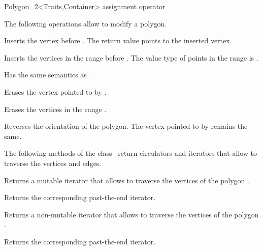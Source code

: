 \begin{ccClassTemplate}{Polygon_2<Traits,Container>}
  \ccHidden{}
   {assignment operator}

\newpage
{}

The following operations allow to modify a polygon.

    { Inserts the vertex  before .
      The return value points to the inserted vertex. }

    { Inserts the vertices in the range \ccStyle{[first, last)} before
      .
      \ccPrecond The value type of points in the range \ccStyle{[first,last)} is
                 .
    }

    { Has the same semantics as .}

    { Erases the vertex pointed to by .}

    { Erases the vertices in the range \ccStyle{[first, last)}.}

    { Reverses the orientation of the polygon. The vertex pointed to by
       remains the same. }

The following methods of the class \ccClassName\ return
circulators and iterators that allow to traverse the vertices and edges.

    { Returns a mutable iterator that allows to traverse the vertices of
      the polygon .}

    { Returns the corresponding past-the-end iterator. }

    { Returns a non-mutable iterator that allows to traverse the vertices of
      the polygon .}

    { Returns the corresponding past-the-end iterator. }


\end{ccClassTemplate}
